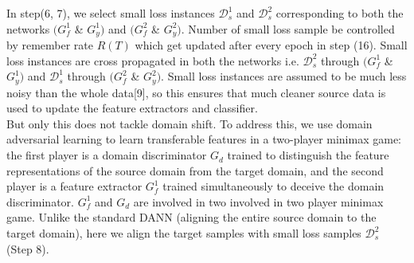  In step(6, 7), we select small loss instances $\mathcal{D}_{s}^1$ and $\mathcal{D}_{s}^2$ corresponding to both the networks $(G_{f}^1$ \& $G_{y}^1)$ and $(G_{f}^2$ \& $G_{y}^2)$. Number of small loss sample be controlled by remember rate $R(T)$ which get updated after every epoch in step (16). Small loss instances are cross propagated in both the networks i.e. $\mathcal{D}_{s}^2$ through $(G_{f}^1$ \& $G_{y}^1)$ and $\mathcal{D}_{s}^1$ through $(G_{f}^2$ \& $G_{y}^2)$. Small loss instances are assumed to be much less noisy than the whole data[9], so this ensures that much cleaner source data is used to update the feature extractors and classifier.\\
 But only this does not tackle domain shift. To address this, we use domain adversarial learning\cite{dann} to learn transferable features in a two-player minimax game: the first player is a domain discriminator $G_d$ trained to distinguish
the feature representations of the source domain from the target domain, and the second player is a feature extractor $G_{f}^1$ trained simultaneously to deceive the domain discriminator. $G_{f}^1$ and $G_d$ are involved in two involved in two player minimax game. Unlike the standard DANN (aligning the entire source domain to the target domain), here we align the target samples with small loss samples $\mathcal{D}_{s}^2$ (Step 8).